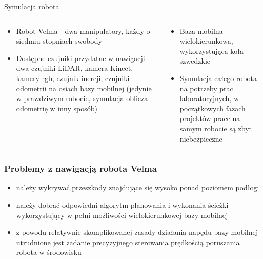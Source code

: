 
\begin{frame}{Symulacja robota}
	\begin{columns}
		\begin{column}{0.5\textwidth}
			\begin{itemize}
				\item Robot Velma - dwa manipulatory, każdy o siedmiu stopniach swobody
				
				
				\item Dostępne czujniki przydatne w nawigacji - dwa czujniki LiDAR, kamera Kinect, kamery rgb, czujnik inercji, czujniki odometrii na osiach bazy mobilnej (jedynie w prawdziwym robocie, symulacja oblicza odometrię w inny sposób)
				
			\end{itemize}
		\end{column}
		\begin{column}{0.5\textwidth}
			\begin{itemize}
				\item Baza mobilna - wielokierunkowa, wykorzystująca koła szwedzkie
				\item Symulacja całego robota na potrzeby prac laboratoryjnych, w początkowych fazach projektów prace na samym robocie są zbyt niebezpieczne
			\end{itemize}
		\end{column}		
	\end{columns}
	
\end{frame}

\begin{frame}
\frametitle{Problemy z nawigacją robota Velma}
	\begin{itemize}
		\item należy wykrywać przeszkody znajdujące się wysoko ponad poziomem podłogi
		\item należy dobrać odpowiedni algorytm planowania i wykonania ścieżki wykorzystujący w pełni możliwości wielokierunkowej bazy mobilnej
		\item z powodu relatywnie skomplikowanej zasady działania napędu bazy mobilnej utrudnione jest zadanie precyzyjnego sterowania prędkością poruszania robota w środowisku
	\end{itemize}
\end{frame}


